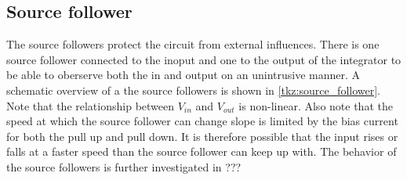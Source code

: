 \subsection{Source follower}\label{ssec:source_follower}
The source followers protect the circuit from external influences. There is one source follower connected to the inoput and one to the output of the integrator to be able to oberserve both the in and output on an unintrusive manner. A schematic overview of a the source followers is shown in \cref{tkz:source_follower}. Note that the relationship between $V_{in}$ and $V_{out}$ is non-linear. Also note that the speed at which the source follower can change slope is limited by the bias current for both the pull up and pull down. It is therefore possible that the input rises or falls at a faster speed than the source follower can keep up with. The behavior of the source followers is further investigated in ???



